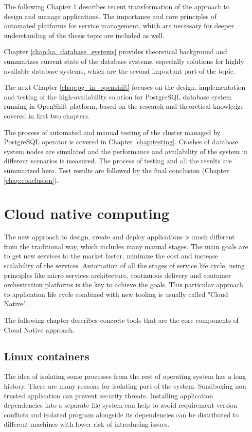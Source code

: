 \documentclass[
  digital, %
  twoside, %
  table,   %
  lof,     %
  lot,     %
]{fithesis3}
\begin{document}
The following Chapter \ref{chap:cloud_native} describes recent transformation of the approach to design and manage applications. The importance and core principles of automated platforms for service management, which are necessary for deeper understanding of the thesis topic are included as well.

Chapter \ref{chap:ha_database_systems} provides theoretical background and summarizes current state of the database systems, especially solutions for highly available database systems, which are the second important part of the topic.

The next Chapter \ref{chap:pg_in_openshift} focuses on the design, implementation and testing of the high-availability solution for PostgreSQL database system running in OpenShift platform, based on the research and theoretical knowledge covered in first two chapters.

The process of automated and manual testing of the cluster managed by PostgreSQL operator is covered in Chapter \ref{chap:testing}. Crashes of database system nodes are simulated and the performance and availability of the system in different scenarios is measured. The process of testing and all the results are summarized here. Test results are followed by the final conclusion (Chapter \ref{chap:conclusion}).

\chapter{Cloud native computing} \label{chap:cloud_native}
The new approach to design, create and deploy applications is much different from the traditional way, which includes many manual stages. The main goals are to get new services to the market faster, minimize the cost and increase scalability of the services. Automation of all the stages of service life cycle, using principles like micro services architecture, continuous delivery and container orchestration platforms is the key to achieve the goals. This particular approach to application life cycle combined with new tooling is usually called "Cloud Native" \cite{cloud_native}.

The following chapter describes concrete tools that are the core components of Cloud Native approach.

\section{Linux containers} \label{sec:containers}
The idea of isolating some processes from the rest of operating system has a long history. There are many reasons for isolating part of the system. Sandboxing non trusted application can prevent security threats. Installing application dependencies into a separate file system can help to avoid requirement version conflicts and isolated program alongside its dependencies can be distributed to different machines with lower risk of introducing issues.
\end{document}
